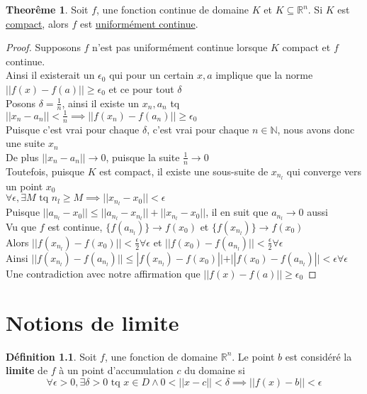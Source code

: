 \documentclass[12pt]{book}
\let\Bbb\mathbb
\def\sep{\phantom{}}
\theoremstyle{definition}
\newtheorem{definition}{Définition}[section]
\newtheorem{theorem}{Theorême}[section]
\begin{document}
\begin{theorem}
    \label{def:compact_implique_continuite_uniforme}
    Soit $f$, une fonction continue de domaine $K$ et $K \subseteq \Bbb R^n$. Si $K$ est \hyperref[def:compacite]{compact}, alors $f$ est 
    \hyperref[def:continuite_uniforme]{uniformément continue}.
\end{theorem}

\begin{proof}
    Supposons $f$ n'est pas uniformément continue lorsque $K$ compact et $f$ continue. \\\sep
    Ainsi il existerait un $\epsilon_0$ qui pour un certain $x,a$ implique que la norme $||f(x) - f(a)|| \geq \epsilon_0$ et ce pour tout $\delta$\\\sep 
    Posons $\delta = \frac{1}{n}$, ainsi il existe un $x_n, a_n$ tq $||x_n - a_n|| < \frac{1}{n} \implies ||f(x_n) - f(a_n)|| \geq \epsilon_0$\\\sep
    Puisque c'est vrai pour chaque $\delta$, c'est vrai pour chaque $n \in \Bbb N$, nous avons donc une suite $x_n$\\\sep
    De plus ${||x_n - a_n||} \to 0$, puisque la suite $\frac{1}{n} \to 0$\\\sep 
    Toutefois, puisque $K$ est compact, il existe une sous-suite de $x_{n_l}$ qui converge vers un point $x_0$ \\\sep
    $\forall \epsilon, \exists M \text{ tq } {n_l} \geq M \implies ||x_{n_l} - x_0|| < \epsilon$ \\\sep
    Puisque $||a_{n_l} - x_0|| \leq ||a_{n_l} - x_{n_l}|| + ||x_{n_l} - x_0 ||$, il en suit que ${a_{n_l}} \to 0$ aussi \\\sep
    Vu que $f$ est continue, $\{f(a_{n_l})\} \to f(x_0)$ et $\{f(x_{n_l})\} \to f(x_0)$ \\\sep 
    Alors $||f(x_{n_l}) - f(x_0)|| < \frac{\epsilon}{2} \forall \epsilon$ et $||f(x_0) - f(a_{n_l})|| < \frac{\epsilon}{2} \forall \epsilon$ \\\sep 
    Ainsi $||f(x_{n_l}) - f(a_{n_l})|| \leq |f(x_{n_l}) - f(x_0)|| + ||f(x_0) - f(a_{n_l})|| < \epsilon \forall \epsilon$ \\\sep 
    Une contradiction avec notre affirmation que $||f(x) - f(a)|| \geq \epsilon_0$
\end{proof}

\chapter{Notions de limite}
\begin{definition}
    \label{def:limite}
    Soit $f$, une fonction de domaine $\Bbb R^n$. Le point $b$ est considéré la \textbf{limite} de $f$ à un point d'accumulation $c$ du domaine si
    $$\forall \epsilon > 0, \exists \delta > 0 \text{ tq } x \in D \land 0 < ||x - c|| < \delta \implies || f(x) - b || < \epsilon$$
\end{definition}
\end{document}
